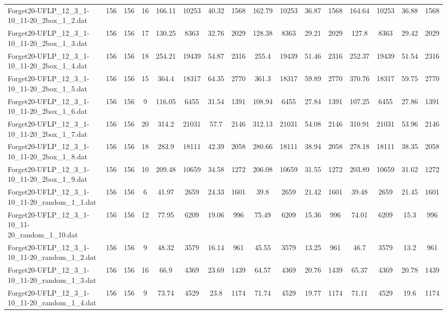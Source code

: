 \begin{sidewaystable}[!ht]
{\begin{tabular}{lccccccccccccccc}
Forget20-UFLP\_12\_3\_1-10\_11-20\_2box\_1\_2.dat & 156 & 156 & 16 & 166.11 & 10253 & 40.32 & 1568 & 162.79 & 10253 & 36.87 & 1568 & 164.64 & 10253 & 36.88 & 1568 \\
Forget20-UFLP\_12\_3\_1-10\_11-20\_2box\_1\_3.dat & 156 & 156 & 17 & 130.25 & 8363 & 32.76 & 2029 & 128.38 & 8363 &  \textcolor{blue2}{29.21} & 2029 & 127.8 & 8363 & 29.42 & 2029 \\
Forget20-UFLP\_12\_3\_1-10\_11-20\_2box\_1\_4.dat & 156 & 156 & 18 & 254.21 & 19439 & 54.87 & 2316 & 255.4 & 19439 &  \textcolor{blue2}{51.46} & 2316 & 252.37 & 19439 & 51.54 & 2316 \\
Forget20-UFLP\_12\_3\_1-10\_11-20\_2box\_1\_5.dat & 156 & 156 & 15 & 364.4 & 18317 & 64.35 & 2770 & 361.3 & 18317 & 59.89 & 2770 & 370.76 & 18317 &  \textcolor{blue2}{59.75} & 2770 \\
Forget20-UFLP\_12\_3\_1-10\_11-20\_2box\_1\_6.dat & 156 & 156 & 9 & 116.05 & 6455 & 31.54 & 1391 & 108.94 & 6455 & 27.84 & 1391 & 107.25 & 6455 & 27.86 & 1391 \\
Forget20-UFLP\_12\_3\_1-10\_11-20\_2box\_1\_7.dat & 156 & 156 & 20 & 314.2 & 21031 & 57.7 & 2146 & 312.13 & 21031 & 54.08 & 2146 & 310.91 & 21031 & 53.96 & 2146 \\
Forget20-UFLP\_12\_3\_1-10\_11-20\_2box\_1\_8.dat & 156 & 156 & 18 & 283.9 & 18111 & 42.39 & 2058 & 280.66 & 18111 & 38.94 & 2058 & 278.18 & 18111 & 38.35 & 2058 \\
Forget20-UFLP\_12\_3\_1-10\_11-20\_2box\_1\_9.dat & 156 & 156 & 10 & 209.48 & 10659 & 34.58 & 1272 & 206.08 & 10659 & 31.55 & 1272 & 203.89 & 10659 & 31.62 & 1272 \\
Forget20-UFLP\_12\_3\_1-10\_11-20\_random\_1\_1.dat & 156 & 156 & 6 & 41.97 & 2659 & 24.33 & 1601 & 39.8 & 2659 & 21.42 & 1601 & 39.48 & 2659 & 21.45 & 1601 \\
Forget20-UFLP\_12\_3\_1-10\_11-20\_random\_1\_10.dat & 156 & 156 & 12 & 77.95 & 6209 & 19.06 & 996 & 75.49 & 6209 & 15.36 & 996 & 74.01 & 6209 &  \textcolor{blue2}{15.3} & 996 \\
Forget20-UFLP\_12\_3\_1-10\_11-20\_random\_1\_2.dat & 156 & 156 & 9 & 48.32 & 3579 & 16.14 & 961 & 45.55 & 3579 & 13.25 & 961 & 46.7 & 3579 &  \textcolor{blue2}{13.2} & 961 \\
Forget20-UFLP\_12\_3\_1-10\_11-20\_random\_1\_3.dat & 156 & 156 & 16 & 66.9 & 4369 & 23.69 & 1439 & 64.57 & 4369 &  \textcolor{blue2}{20.76} & 1439 & 65.37 & 4369 & 20.78 & 1439 \\
Forget20-UFLP\_12\_3\_1-10\_11-20\_random\_1\_4.dat & 156 & 156 & 9 & 73.74 & 4529 & 23.8 & 1174 & 71.74 & 4529 & 19.77 & 1174 & 71.11 & 4529 & 19.6 & 1174 \\

\end{tabular}}
\end{sidewaystable}
